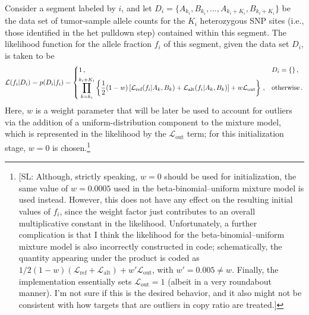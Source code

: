 \documentclass[nofootinbib,amssymb,amsmath]{revtex4}
\def\SL#1{{\color [rgb]{0,0,0.8} [SL: #1]}}
\begin{document}
Consider a segment labeled by $i$, and let $D_i = \{A_{k_i}, B_{k_i}, \dots , A_{k_i+K_i}, B_{k_i+K_i}\}$ be the data set of tumor-sample allele counts for the $K_i$ heterozygous SNP sites (i.e., those identified in the het pulldown step) contained within this segment.  The likelihood function for the allele fraction $f_i$ of this segment, given the data set $D_i$, is taken to be
\begin{equation} \label{allele-frac-ll}
\mathcal{L}(f_i | D_i) = p(D_i | f_i) = 
\begin{dcases}
1\,, & D_i = \{\}\,, \\
\prod_{k = k_i}^{k_i + K_i} \left\{\frac{1}{2}(1-w)\left[\mathcal{L}_\text{ref}(f_i | A_k, B_k) + \mathcal{L}_\text{alt}(f_i | A_k, B_k)\right] + w\mathcal{L}_\text{out}\right\}\,, & \text{otherwise}\,.
\end{dcases}
\end{equation}
Here, $w$ is a weight parameter that will be later be used to account for outliers via the addition of a uniform-distribution component to the mixture model, which is represented in the likelihood by the $\mathcal{L}_\text{out}$ term; for this initialization stage, $w = 0$ is chosen.\footnote{\SL{Although, strictly speaking, $w=0$ should be used for initialization, the same value of $w = 0.0005$ used in the beta-binomial--uniform mixture model is used instead.  However, this does not have any effect on the resulting initial values of $f_i$, since the weight factor just contributes to an overall multiplicative constant in the likelihood.  Unfortunately, a further complication is that I think the likelihood for the beta-binomial--uniform mixture model is also incorrectly constructed in code; schematically, the quantity appearing under the product is coded as $1/2 (1-w)(\mathcal{L}_\textrm{ref} + \mathcal{L}_\textrm{alt}) + w' \mathcal{L}_\text{out}$, with $w' = 0.005 \neq w$.  Finally, the implementation essentially sets $\mathcal{L}_\text{out} = 1$ (albeit in a very roundabout manner).  I'm not sure if this is the desired behavior, and it also might not be consistent with how targets that are outliers in copy ratio are treated.}}
\end{document}
